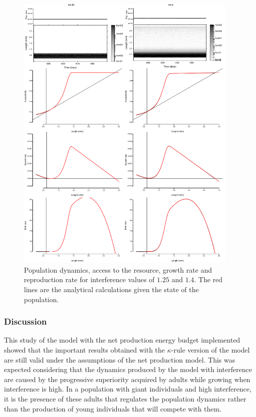 \begin{figure}[!h] %
\centering
\includegraphics[width=0.95\textwidth]{4_ChapThe1/Fig/FigSM10}
\caption[Sample simulation for I=1.25
and I=1.45 (net production model)]{Population dynamics, access to the resource,
growth rate and reproduction rate for interference values of $1.25$ and $1.4$. The red lines are
the analytical calculations given the state of the population.}
\label{Fig4-SM10}
\end{figure}

\subsubsection{Discussion}

This study of the model with the net production energy budget implemented showed
that the important results obtained with the $\kappa$-rule version of the model
are still valid under the assumptions of the net production model. This was expected
considering that the dynamics produced by the model with interference are caused
by the progressive superiority acquired by adults while growing when
interference is high. In a population with giant individuals and high
interference, it is the presence of these adults that regulates the population
dynamics rather than the production of young individuals that will compete with
them.

